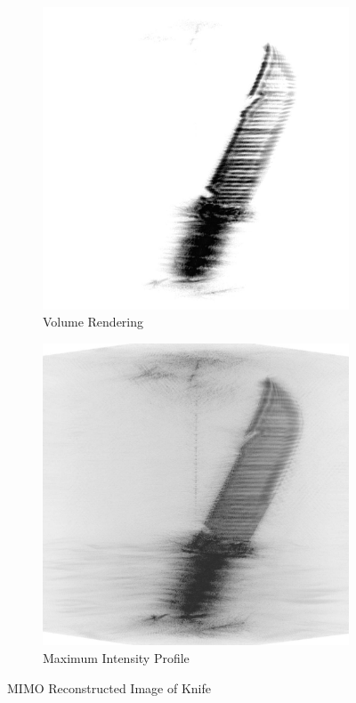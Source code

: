 \documentclass[conference]{IEEEtran}
\begin{document}
		\begin{figure} [h]
			\begin{subfigure}{.5\linewidth}
				\centering
				\includegraphics[width=1\linewidth]{../MatlabResults/knife_MIMO_vr}
				\caption{Volume Rendering}
				\label{fig:knife_MIMO_vr}
			\end{subfigure}%
			\begin{subfigure}{.5\linewidth}
				\centering
				\includegraphics[width=1\linewidth]{../MatlabResults/knife_MIMO_mip}
				\caption{Maximum Intensity Profile}
				\label{fig:knife_MIMO_mip}
			\end{subfigure}
			\caption{MIMO Reconstructed Image of Knife}
			\label{fig:knife_MIMO}
		\end{figure}
	
\end{document}
